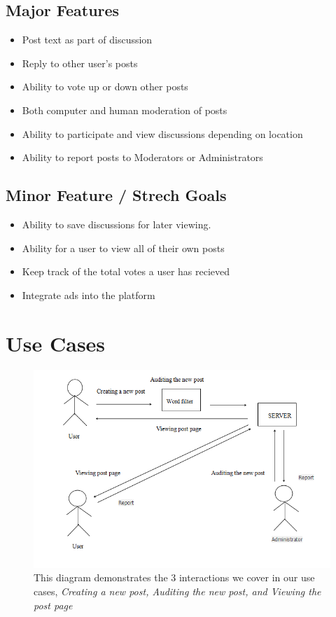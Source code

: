 \documentclass[12pt]{article}
\begin{document}
\subsection{Major Features}
\begin{itemize}
      \item Post text as part of discussion
      \item Reply to other user's posts
      \item Ability to vote up or down other posts
      \item Both computer and human moderation of posts
      \item Ability to participate and view discussions depending on location
      \item Ability to report posts to Moderators or Administrators
\end{itemize}
\subsection{Minor Feature / Strech Goals}
\begin{itemize}
      \item Ability to save discussions for later viewing.
      \item Ability for a user to view all of their own posts
      \item Keep track of the total votes a user has recieved
      \item Integrate ads into the platform
\end{itemize}


\section{Use Cases}

\begin{figure}
  \includegraphics[scale=0.75]{use_case_diagram}
  \caption{This diagram demonstrates the 3 interactions we cover in our use cases, \textit{Creating a new post, Auditing the new post, and Viewing the post page}}
\end{figure}
\end{document}
